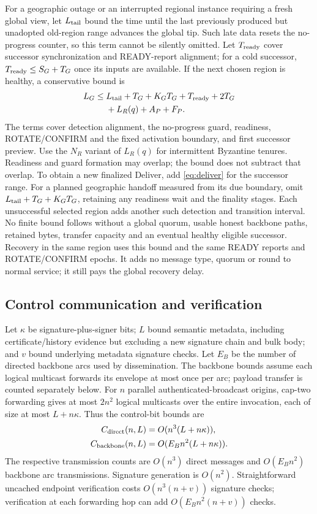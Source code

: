 \documentclass[11pt,a4paper,onecolumn]{article}
\theoremstyle{remark}\newtheorem{example}[definition]{Example}
\begin{document}
For a geographic outage or an interrupted regional instance requiring a fresh
global view, let $L_{\rm tail}$ bound the time until the last
previously produced but unadopted old-region range advances the global tip.
Such late data resets the no-progress counter, so this term cannot be silently
omitted. Let $T_{\rm ready}$ cover successor synchronization and READY-report
alignment; for a cold successor, $T_{\rm ready}\leq S_G+T_G$ once its inputs are
available. If the next chosen region is healthy, a conservative bound is
\begin{equation}\label{eq:georecover}
\begin{split}
 L_G\leq{}&L_{\rm tail}+T_G+K_GT_G+T_{\rm ready}+2T_G\\
          &{}+L_R(q)+A_P+F_P.
\end{split}
\end{equation}
The terms cover detection alignment, the no-progress guard, readiness,
ROTATE/CONFIRM and the fixed activation boundary, and first successor preview.
Use the $N_R$ variant of $L_R(q)$ for intermittent Byzantine tenures.
Readiness and guard formation may overlap; the bound does not subtract that
overlap. To obtain a new finalized Deliver, add \eqref{eq:deliver} for the
successor range. For a planned geographic handoff measured from its due boundary,
omit $L_{\rm tail}+T_G+K_GT_G$, retaining any readiness wait and the finality
stages. Each unsuccessful selected region adds another such detection and
transition interval. No finite bound follows without a global quorum, usable
honest backbone paths, retained bytes, transfer capacity and an eventual healthy
eligible successor. Recovery in the same region uses this bound and the same
READY reports and ROTATE/CONFIRM epochs. It adds no message type, quorum or
round to normal service; it still pays the global recovery delay.

\subsection{Control communication and verification}\label{sec:controlcost}
Let $\kappa$ be signature-plus-signer bits; $L$ bound semantic metadata,
including certificate/history evidence but excluding a new signature chain
and bulk body; and $v$ bound underlying metadata signature checks.
Let $E_B$ be the number of directed backbone arcs used by dissemination.
The backbone bounds assume each logical multicast forwards its envelope at
most once per arc; payload transfer is counted separately below.
For $n$ parallel authenticated-broadcast origins, cap-two forwarding gives at
most $2n^2$ logical multicasts over the entire invocation, each of size at most
$L+n\kappa$. Thus the control-bit bounds are
\begin{align}
 C_{\rm direct}(n,L)&=O(n^3(L+n\kappa)),\label{eq:directcost}\\
 C_{\rm backbone}(n,L)&=O(E_Bn^2(L+n\kappa)).\label{eq:backbonecost}
\end{align}
The respective transmission counts are $O(n^3)$ direct messages and $O(E_Bn^2)$
backbone arc transmissions. Signature generation is $O(n^2)$. Straightforward
uncached endpoint verification costs $O(n^3(n+v))$ signature checks; verification
at each forwarding hop can add $O(E_Bn^2(n+v))$ checks.
\end{document}
